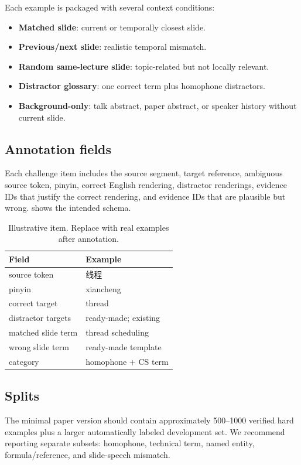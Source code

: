 Each example is packaged with several context conditions:
\begin{itemize}[leftmargin=*]
    \item \textbf{Matched slide}: current or temporally closest slide.
    \item \textbf{Previous/next slide}: realistic temporal mismatch.
    \item \textbf{Random same-lecture slide}: topic-related but not locally relevant.
    \item \textbf{Distractor glossary}: one correct term plus homophone distractors.
    \item \textbf{Background-only}: talk abstract, paper abstract, or speaker history without current slide.
\end{itemize}

\subsection{Annotation fields}

Each challenge item includes the source segment, target reference, ambiguous source token, pinyin, correct English rendering, distractor renderings, evidence IDs that justify the correct rendering, and evidence IDs that are plausible but wrong.   shows the intended schema.

\begin{table}[t]
\centering
\small
\begin{tabular}{ll}
\toprule
Field & Example \\
\midrule
source token & 线程 \\
pinyin & xiancheng \\
correct target & thread \\
distractor targets & ready-made; existing \\
matched slide term & thread scheduling \\
wrong slide term & ready-made template \\
category & homophone + CS term \\
\bottomrule
\end{tabular}
\caption{Illustrative \datasetname{} item.  Replace with real examples after annotation.}
\label{tab:dataset-example}
\end{table}

\subsection{Splits}

The minimal paper version should contain approximately 500--1000 verified hard examples plus a larger automatically labeled development set.  We recommend reporting separate subsets: homophone, technical term, named entity, formula/reference, and slide-speech mismatch.

